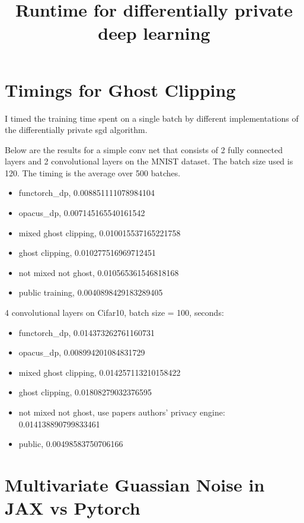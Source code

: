 \documentclass{article}
\date{}
\author{}
\title{Runtime for differentially private deep learning}
\theoremstyle{plain}
\begin{document}
\maketitle
    
\doublespacing
\section*{Timings for Ghost Clipping}
I timed the training time spent on a single batch by different implementations of the differentially private sgd algorithm.

Below are the results for a simple conv net that consists of 2 fully connected layers and 2 convolutional layers on the MNIST dataset. The batch size used is 120. The timing is the average over 500 batches.
\begin{itemize}
    \item functorch\_dp, 0.008851111078984104
    \item opacus\_dp, 0.007145165540161542
    \item mixed ghost clipping, 0.010015537165221758
    \item ghost clipping, 0.010277516969712451
    \item not mixed not ghost, 0.010565361546818168
    \item public training, 0.0040898429183289405
\end{itemize}

4 convolutional layers on Cifar10, batch size = 100, seconds:
\begin{itemize}
    \item functorch\_dp, 0.014373262761160731
    \item opacus\_dp, 0.008994201084831729
    \item mixed ghost clipping, 0.014257113210158422
    \item ghost clipping, 0.01808279032376595
    \item not mixed not ghost, use papers authors' privacy engine:  0.014138890799833461
    \item public, 0.00498583750706166
\end{itemize}

\section*{Multivariate Guassian Noise in JAX vs Pytorch}
\end{document}
